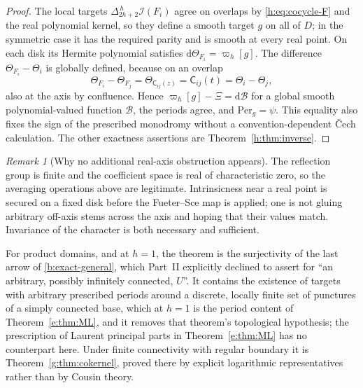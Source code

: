 \documentclass[11pt,a4paper]{article}
\numberwithin{equation}{section}
\theoremstyle{definition}
\theoremstyle{remark}
\newtheorem{remark}[theorem]{Remark}
\theoremstyle{plain}
\newcommand{\I}{\mathcal I}
\newcommand{\Per}{\mathrm{Per}}
\newcommand{\dd}{\mathrm d}
\newcommand{\lapH}{\Delta_{2h+2}^{\,h}}
\newcommand{\cur}{\varpi}                         %
\newcommand{\Herm}{\Theta}                        %
\begin{document}
\begin{proof}
The local targets $\lapH\I(F_i)$ agree on overlaps by \eqref{h:eq:cocycle-F}
and the real polynomial kernel, so they define a smooth target $g$ on all of
$D$; in the symmetric case it has the required parity and is smooth at every
real point. On each disk its Hermite polynomial satisfies
$\dd\Herm_{F_i}=\cur_h[g]$. The difference $\Herm_{F_i}-\Herm_i$ is globally
defined, because on an overlap
\[
 \Herm_{F_i}-\Herm_{F_j}=\Herm_{\mathsf C_{ij}(z)}=\mathsf C_{ij}(t)
 =\Herm_i-\Herm_j ,
\]
also at the axis by confluence. Hence $\cur_h[g]-\Xi=\dd\mathscr B$ for a
global smooth polynomial-valued function $\mathscr B$, the periods agree, and
$\Per_g=\psi$. This equality also fixes the sign of the prescribed monodromy
without a convention-dependent \v{C}ech calculation. The other exactness
assertions are Theorem~\ref{h:thm:inverse}.
\end{proof}

\begin{remark}[Why no additional real-axis obstruction appears]
\label{h:rem:no-axis-obstruction}
The reflection group is finite and the coefficient space is real of
characteristic zero, so the averaging operations above are legitimate.
Intrinsicness near a real point is secured on a fixed disk before the Fueter--Sce
map is applied; one is not gluing arbitrary off-axis stems across the axis and
hoping that their values match. Invariance of the character is both necessary
and sufficient.
\end{remark}

For product domains, and at $h=1$, the theorem is the surjectivity of the last
arrow of \eqref{b:exact-general}, which Part~II explicitly declined to assert
for ``an arbitrary, possibly infinitely connected, $U$''. It contains the
existence of targets with arbitrary prescribed periods around a discrete,
locally finite set of punctures of a simply connected base, which at $h=1$ is
the period content of Theorem~\ref{e:thm:ML}, and it removes that theorem's
topological hypothesis; the prescription of Laurent principal parts in
Theorem~\ref{e:thm:ML} has no counterpart here. Under finite
connectivity with regular boundary it is Theorem~\ref{g:thm:cokernel}, proved
there by explicit logarithmic representatives rather than by Cousin theory.
\end{document}

